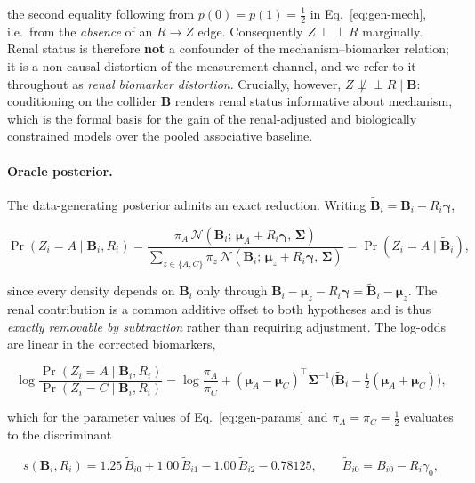 the second equality following from $p(0) = p(1) = \tfrac12$ in
Eq.~\eqref{eq:gen-mech}, i.e.\ from the \emph{absence} of an $R \rightarrow Z$
edge. Consequently $Z \perp\!\!\!\perp R$ marginally. Renal status is therefore
\textbf{not} a confounder of the mechanism--biomarker relation; it is a
non-causal distortion of the measurement channel, and we refer to it throughout
as \emph{renal biomarker distortion}. Crucially, however,
$Z \not\perp\!\!\!\perp R \mid \bm{B}$: conditioning on the collider $\bm{B}$
renders renal status informative about mechanism, which is the formal basis for
the gain of the renal-adjusted and biologically constrained models over the
pooled associative baseline.

\paragraph{Oracle posterior.}
The data-generating posterior admits an exact reduction. Writing
$\tilde{\bm{B}}_i = \bm{B}_i - R_i \bm{\gamma}$,

\begin{equation}
  \Pr(Z_i = A \mid \bm{B}_i, R_i)
  = \frac{\pi_A\, \mathcal{N}(\bm{B}_i;\, \bm{\mu}_A + R_i\bm{\gamma},\, \bm{\Sigma})}
         {\displaystyle\sum_{z \in \{A,C\}}
           \pi_z\, \mathcal{N}(\bm{B}_i;\, \bm{\mu}_z + R_i\bm{\gamma},\, \bm{\Sigma})}
  = \Pr(Z_i = A \mid \tilde{\bm{B}}_i),
  \label{eq:oracle}
\end{equation}

since every density depends on $\bm{B}_i$ only through
$\bm{B}_i - \bm{\mu}_z - R_i\bm{\gamma} = \tilde{\bm{B}}_i - \bm{\mu}_z$. The
renal contribution is a common additive offset to both hypotheses and is thus
\emph{exactly removable by subtraction} rather than requiring adjustment. The
log-odds are linear in the corrected biomarkers,

\begin{equation}
  \log \frac{\Pr(Z_i = A \mid \bm{B}_i, R_i)}{\Pr(Z_i = C \mid \bm{B}_i, R_i)}
  = \log\frac{\pi_A}{\pi_C}
    + (\bm{\mu}_A - \bm{\mu}_C)^{\!\top} \bm{\Sigma}^{-1}
      \Big( \tilde{\bm{B}}_i - \tfrac{1}{2}(\bm{\mu}_A + \bm{\mu}_C) \Big),
  \label{eq:logodds}
\end{equation}

which for the parameter values of Eq.~\eqref{eq:gen-params} and
$\pi_A = \pi_C = \tfrac12$ evaluates to the discriminant

\begin{equation}
  s(\bm{B}_i, R_i)
  = 1.25\,\tilde{B}_{i0} + 1.00\,\tilde{B}_{i1} - 1.00\,\tilde{B}_{i2} - 0.78125,
  \qquad \tilde{B}_{i0} = B_{i0} - R_i \gamma_0 ,
  \label{eq:discriminant}
\end{equation}

